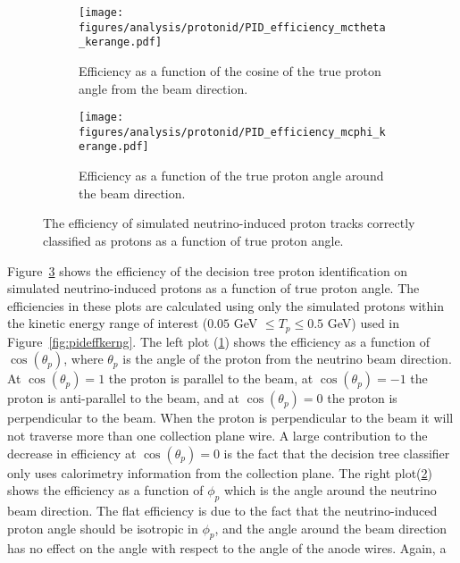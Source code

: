     \begin{figure}[h]
      \centering
      \begin{subfigure}[t]{2.8in}
        \texttt{[image: figures/analysis/protonid/PID\_efficiency\_mctheta\_kerange.pdf]}
        \caption{Efficiency as a function of the cosine of the true proton
          angle from the beam direction.}
        \label{fig:pideffangletheta}
      \end{subfigure}
      \hspace{2pt}
      \begin{subfigure}[t]{2.8in}
        \texttt{[image: figures/analysis/protonid/PID\_efficiency\_mcphi\_kerange.pdf]}
        \caption{Efficiency as a function of the true proton angle around the beam direction.}
        \label{fig:pideffanglephi}
      \end{subfigure}
      \caption{The efficiency of simulated neutrino-induced proton tracks
        correctly classified as protons as a function of true proton angle.}
      \label{fig:pideffangle}
    \end{figure}
    Figure~\ref{fig:pideffangle} shows the efficiency of the decision tree
    proton identification on simulated neutrino-induced protons as a function
    of true proton angle. The efficiencies in these plots are calculated using
    only the simulated protons within the kinetic energy range of interest
    ($0.05$ GeV $\le T_p \le 0.5$ GeV) used in Figure~\ref{fig:pideffkerng}.
    The left plot (\ref{fig:pideffangletheta}) shows the efficiency as a
    function of $\cos(\theta_p)$, where $\theta_p$ is the angle of the proton
    from the neutrino beam direction. At $\cos(\theta_p) = 1$ the proton is
    parallel to the beam, at $\cos(\theta_p) = -1$ the proton is anti-parallel
    to the beam, and at $\cos(\theta_p) = 0$ the proton is perpendicular to the
    beam. When the proton is perpendicular to the beam it will not traverse
    more than one collection plane wire. A large contribution to the decrease
    in efficiency at $\cos(\theta_p) = 0$ is the fact that the decision tree
    classifier only uses calorimetry information from the collection plane. The
    right plot(\ref{fig:pideffanglephi}) shows the efficiency as a function of
    $\phi_p$ which is the angle around the neutrino beam direction. The flat
    efficiency is due to the fact that the neutrino-induced proton angle should
    be isotropic in $\phi_p$, and the angle around the beam direction has no
    effect on the angle with respect to the angle of the anode wires. Again, a
